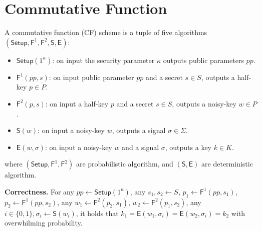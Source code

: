 \section{Commutative Function}\label{sec:cf}
A commutative function (CF) scheme is a tuple of five algorithms $(\mathsf{Setup},\mathsf{F}^1,\mathsf{F}^2,\mathsf{S},\mathsf{E})$:
\begin{itemize}
\item $\mathsf{Setup}(1^\kappa)$: on input the security parameter $\kappa$ outputs public parameters $pp$. 

\item $\mathsf{F}^1(pp,s)$: on input public parameter $pp$ and a secret $s\in S$, outputs a half-key $p\in P$.

\item $\mathsf{F}^2(p, s)$: on input a half-key $p$ and a secret $s \in S$, outputs a noisy-key $w \in P$.

\item $\mathsf{S}(w)$: on input a noisy-key $w$, outputs a signal $\sigma \in \Sigma$. 

\item $\mathsf{E}(w,\sigma)$: on input a noisy-key $w$ and a signal $\sigma$, outputs a key $k \in K$. 
\end{itemize}
where $(\mathsf{Setup},\mathsf{F}^1,\mathsf{F}^2)$ are probabilistic algorithm, and $(\mathsf{S},\mathsf{E})$ are deterministic algorithm.

\begin{trivlist}
\item \textbf{Correctness.} For any $pp \leftarrow \mathsf{Setup}(1^\kappa)$, 
    any $s_1,s_2\leftarrow S$, $p_1 \leftarrow \mathsf{F}^1(pp,s_1)$, $p_2 \leftarrow \mathsf{F}^1(pp,s_2)$, any $w_1 \leftarrow \mathsf{F}^2(p_2,s_1)$, $w_2 \leftarrow \mathsf{F}^2(p_1,s_2)$, any $i\in \{0,1\}, \sigma_i \leftarrow \mathsf{S}(w_i)$, 
    it holds that $k_1=\mathsf{E}(w_1,\sigma_i ) = \mathsf{E}(w_2,\sigma_i)=k_2$ with overwhilming probability. 
\end{trivlist}


